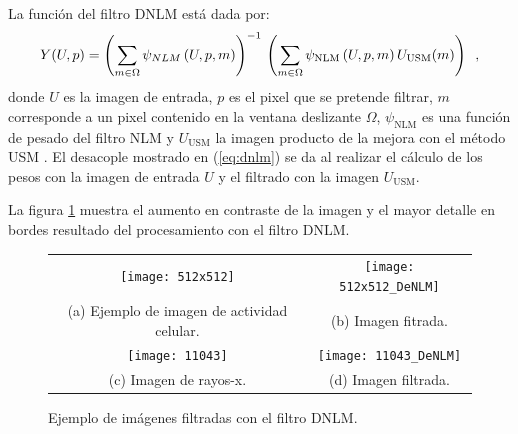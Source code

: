 La función del filtro DNLM est\'a dada por:
%
\begin{equation}
\label{eq:dnlm}
Y(U,p)=\left(\sum_{m\in \Omega}\psi_{NLM}\left(U, p, m\right)\right)^{-1} \\ \left(\sum_{m\in \Omega}\psi_{\textrm{NLM}}\left(U, p, m\right)U_{\textrm{USM}}(m)\right) \enspace ,
\end{equation}
%
donde $U$ es la imagen de entrada, $p$ es el pixel que se pretende filtrar, $m$ corresponde a un pixel contenido en la ventana deslizante $\Omega$, $\psi_{\textrm{NLM}}$ es una función de pesado del filtro NLM y $U_{\textrm{USM}}$ la imagen producto de la mejora con el método USM \cite{calderon2015dewaff}. El desacople mostrado en (\ref{eq:dnlm}) se da al realizar el c\'alculo de los pesos con la imagen de entrada $U$ y el filtrado con la imagen $U_{\textrm{USM}}$.

La figura \ref{fig:exampleDNLM} muestra el aumento en contraste de la imagen y el mayor detalle en bordes resultado del procesamiento con el filtro DNLM.

\begin{figure}[htb]
\centering
\begin{tabular}{cc}
  \texttt{[image: 512x512]} &
  \texttt{[image: 512x512\_DeNLM]} \\
  (a) Ejemplo de imagen de actividad celular. &
  (b) Imagen fitrada. \\
  \texttt{[image: 11043]} &
  \texttt{[image: 11043\_DeNLM]} \\
  (c) Imagen de rayos-x. &
  (d) Imagen filtrada. 
\end{tabular}
%
%
\caption[Ejemplo de im\'agenes filtradas con el filtro DNLM]{Ejemplo de im\'agenes filtradas con el filtro DNLM. \label{fig:exampleDNLM}}

%
\end{figure}




